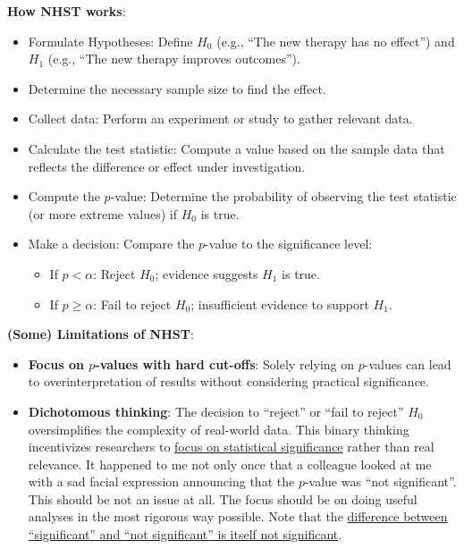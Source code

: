\documentclass[
]{book}
\providecommand{\tightlist}{%
  \setlength{\itemsep}{0pt}\setlength{\parskip}{0pt}}
\begin{document}
\textbf{How NHST works}:

\begin{itemize}
\item
  Formulate Hypotheses: Define \(H_0\) (e.g., ``The new therapy has no effect'')
  and \(H_1\) (e.g., ``The new therapy improves outcomes'').
\item
  Determine the necessary sample size to find the effect.
\item
  Collect data: Perform an experiment or study to gather relevant data.
\item
  Calculate the test statistic: Compute a value based on the sample data that
  reflects the difference or effect under investigation.
\item
  Compute the \(p\)-value: Determine the probability of observing the
  test statistic (or more extreme values) if \(H_0\) is true.
\item
  Make a decision: Compare the \(p\)-value to the significance level:

  \begin{itemize}
  \tightlist
  \item
    If \(p < \alpha\): Reject \(H_0\); evidence suggests \(H_1\) is true.
  \item
    If \(p \ge \alpha\): Fail to reject \(H_0\); insufficient evidence to support \(H_1\).
  \end{itemize}
\end{itemize}

\textbf{(Some) Limitations of NHST}:

\begin{itemize}
\item
  \textbf{Focus on \(p\)-values with hard cut-offs}: Solely relying on \(p\)-values can lead to overinterpretation of
  results without considering practical significance.
\item
  \textbf{Dichotomous thinking}: The decision to ``reject'' or ``fail to reject'' \(H_0\)
  oversimplifies the complexity of real-world data. This binary thinking
  incentivizes researchers to \href{https://www.tandfonline.com/doi/full/10.1080/00031305.2018.1447512}{focus on statistical significance}
  rather than real relevance. It happened to me not only once that a colleague
  looked at me with a sad facial expression announcing that the \(p\)-value was ``not significant''.
  This should be not an issue at all. The focus should be on doing useful analyses in the most
  rigorous way possible. Note that the \href{https://doi.org/10.1198/000313006X152649}{difference between ``significant'' and ``not significant'' is
  itself not significant}.
\end{itemize}
\end{document}
